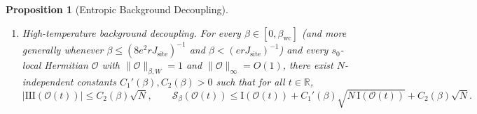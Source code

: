 \documentclass[11pt,a4paper]{article}
\numberwithin{equation}{section}
\theoremstyle{plain}
\newtheorem{proposition}[theorem]{Proposition}
\theoremstyle{definition}
\begin{document}
\begin{proposition}[Entropic Background Decoupling]
\begin{enumerate}
  \item[\emph{(2)}] \emph{High-temperature background decoupling.} For every $\beta\in[0,\beta_{\mathrm{wc}}]$ (and more generally whenever $\beta \le (8e^2 r J_{\mathrm{site}})^{-1}$ and $\beta < (erJ_{\mathrm{site}})^{-1}$) and every $s_0$-local Hermitian $\mathcal{O}$ with $\|\mathcal{O}\|_{\beta,W}=1$ and $\|\mathcal{O}\|_\infty = O(1)$, there exist $N$-independent constants $C_1'(\beta), C_2(\beta) > 0$ such that for all $t\in\mathbb{R}$,
  \begin{equation}\label{eq:entropic-decoupling}
    \bigl|\mathrm{III}(\mathcal{O}(t))\bigr| \le C_2(\beta)\sqrt{N}, \qquad
    \mathcal{S}_\beta(\mathcal{O}(t)) \le \mathrm{I}(\mathcal{O}(t)) + C_1'(\beta)\sqrt{N\,\mathrm{I}(\mathcal{O}(t))} + C_2(\beta)\sqrt{N}.
  \end{equation}
\end{enumerate}
\end{proposition}
\end{document}
